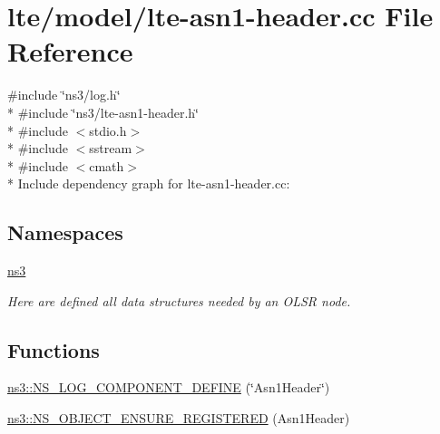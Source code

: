 \hypertarget{lte-asn1-header_8cc}{}\section{lte/model/lte-\/asn1-\/header.cc File Reference}
\label{lte-asn1-header_8cc}
{\ttfamily \#include \char`\"{}ns3/log.\+h\char`\"{}}\\*
{\ttfamily \#include \char`\"{}ns3/lte-\/asn1-\/header.\+h\char`\"{}}\\*
{\ttfamily \#include $<$stdio.\+h$>$}\\*
{\ttfamily \#include $<$sstream$>$}\\*
{\ttfamily \#include $<$cmath$>$}\\*
Include dependency graph for lte-\/asn1-\/header.cc\+:
\subsection*{Namespaces}
\begin{DoxyCompactItemize}
\item 
 \hyperlink{namespacens3}{ns3}
\begin{DoxyCompactList}\small\item\em Here are defined all data structures needed by an O\+L\+SR node. \end{DoxyCompactList}\end{DoxyCompactItemize}
\subsection*{Functions}
\begin{DoxyCompactItemize}
\item 
\hyperlink{namespacens3_aca90ef3e541fa45e8661fbf9a9492746}{ns3\+::\+N\+S\+\_\+\+L\+O\+G\+\_\+\+C\+O\+M\+P\+O\+N\+E\+N\+T\+\_\+\+D\+E\+F\+I\+NE} (\char`\"{}Asn1\+Header\char`\"{})
\item 
\hyperlink{namespacens3_aefe07edf74de76ef01226dfbdc03a49e}{ns3\+::\+N\+S\+\_\+\+O\+B\+J\+E\+C\+T\+\_\+\+E\+N\+S\+U\+R\+E\+\_\+\+R\+E\+G\+I\+S\+T\+E\+R\+ED} (Asn1\+Header)
\end{DoxyCompactItemize}
